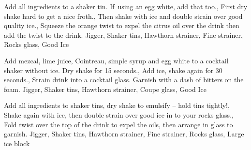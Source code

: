 \documentclass[../main.tex]{subfiles}
\begin{document}

    {
            {Add all ingredients to a shaker tin. If~using an egg white, add that too.},
            {First dry shake hard to get a nice froth.},
            {Then shake with ice and double strain over good quality ice.},
            {Squeeze the orange twist to expel the citrus oil over the drink then add the twist to the drink.}
    }
    {Jigger, Shaker tins, Hawthorn strainer, Fine strainer, Rocks glass, Good Ice}%

    \cocktailDivider

    {
            {Add mezcal, lime juice, Cointreau, simple syrup and egg white to a cocktail shaker without ice. Dry shake for 15 seconds.},
            {Add ice, shake again for 30 seconds.},
            {Strain drink into a cocktail glass. Garnish with a dash of bitters on the foam.}
    }
    {Jigger, Shaker tins, Hawthorn strainer, Coupe glass, Good Ice}

    \cocktailDivider

    {
            {Add all ingredients to shaker tins, dry shake to emulsify -- hold tins tightly!},
            {Shake again with ice, then double strain over good ice in to your rocks glass}.,
            {Fold twist over the top of the drink to expel the oils, then arrange in glass to garnish.}
    }
    {Jigger, Shaker tins, Hawthorn strainer, Fine strainer, Rocks glass, Large ice block}

    \clearpage
\end{document}
